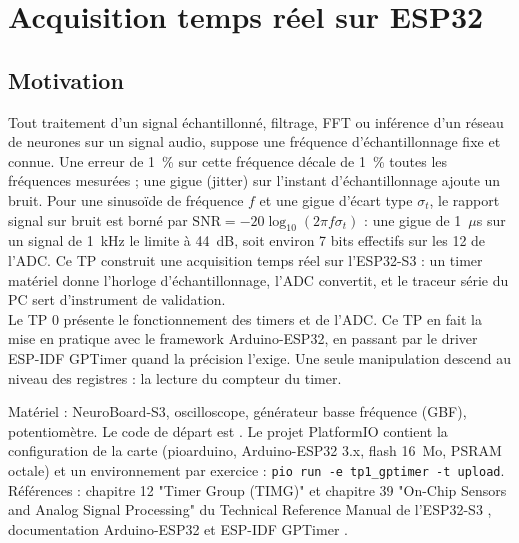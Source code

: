 
\chapter{Acquisition temps réel sur ESP32}

\section*{Motivation}

Tout traitement d'un signal échantillonné, filtrage, FFT ou inférence d'un réseau de neurones sur un signal audio, suppose une fréquence d'échantillonnage fixe et connue. Une erreur de 1~\% sur cette fréquence décale de 1~\% toutes les fréquences mesurées ; une gigue (jitter) sur l'instant d'échantillonnage ajoute un bruit. Pour une sinusoïde de fréquence $f$ et une gigue d'écart type $\sigma_t$, le rapport signal sur bruit est borné par $\mathrm{SNR} = -20\log_{10}(2\pi f \sigma_t)$ : une gigue de 1~$\mu$s sur un signal de 1~kHz le limite à 44~dB, soit environ 7 bits effectifs sur les 12 de l'ADC. Ce TP construit une acquisition temps réel sur l'ESP32-S3 : un timer matériel donne l'horloge d'échantillonnage, l'ADC convertit, et le traceur série du PC sert d'instrument de validation. \\

Le TP 0 présente le fonctionnement des timers et de l'ADC. Ce TP en fait la mise en pratique avec le framework Arduino-ESP32, en passant par le driver ESP-IDF GPTimer quand la précision l'exige. Une seule manipulation descend au niveau des registres : la lecture du compteur du timer. \\

\begin{imp}
Matériel : NeuroBoard-S3, oscilloscope, générateur basse fréquence (GBF), potentiomètre. Le code de départ est . Le projet PlatformIO  contient la configuration de la carte (pioarduino, Arduino-ESP32 3.x, flash 16~Mo, PSRAM octale) et un environnement par exercice : \texttt{pio run -e tp1\_gptimer -t upload}. Références : chapitre 12 "Timer Group (TIMG)" et chapitre 39 "On-Chip Sensors and Analog Signal Processing" du Technical Reference Manual de l'ESP32-S3 \cite{esp32s3_trm}, documentation Arduino-ESP32 \cite{arduino_timer,arduino_adc} et ESP-IDF GPTimer \cite{esp32s3_gptimer}.
\end{imp}


